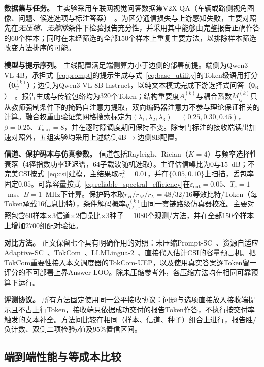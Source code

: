 \documentclass[journal]{IEEEtran}
\begin{document}
\textbf{数据集与任务。}
主实验采用车联网视觉问答数据集V2X-QA（车辆或路侧视角图像、问题、候选选项与标注答案）~\cite{you2026v2xqa}。为区分通信损失与上游感知失败，主要对照先在\emph{无压缩、无擦除}条件下检验报告充分性，并采用其中能够由完整报告正确作答的$60$个样本；同时在未经筛选的全部$150$个样本上重复主要方法，以排除样本筛选改变方法排序的可能。

\textbf{模型与提示序列。}
主线配置满足端侧算力小于边侧的部署前提。端侧为Qwen3-VL-4B，承担式~\eqref{eq:prompt}的提示生成与式~\eqref{eq:base_utility}的Token级语用打分（$\bm\theta_{\mathrm T}^{(k)}$）；边侧为Qwen3-VL-8B-Instruct，以纯文本模式完成下游选择式问答（$\bm\theta_{\mathrm R}$）~\cite{bai2025qwen3vl}。报告生成与传输包络均为$320$个Token；结构重要度$A_i^{(k)}$与耦合系数$M_{ij}^{(k)}$只从教师强制条件下的掩码自注意力提取，双向编码器注意力不参与理论保证相关的计算。融合权重由验证集网格搜索标定为$(\lambda_1,\lambda_2,\lambda_3)=(0.25,0.30,0.45)$，$\beta=0.25$、$T_{\max}=8$，并在逐时隙调度期间保持不变。除专门标注的接收端读出加速对照外，五组实验均采用上述端侧4B$\rightarrow$边侧8B配置。

\textbf{信道、保护码本与仿真参数。}
信道包括Rayleigh、Rician（$K=4$）与频率选择性衰落（4径指数功率延迟谱，64子载波随机选取）。主评估信噪比为$0$与$15$~dB；不完美CSI按式~\eqref{eq:csi}建模，主结果取$\sigma_e^2=0.01$，并在$\{0.05,0.10\}$上扫描，丢包率固定$0.05$。可靠容量按式~\eqref{eq:reliable_spectral_efficiency}在$\varepsilon_{\mathrm{out}}=0.05$、$T_s=1$~ms、$B=1$~MHz下计算。保护码本取$r_H/r_M/r_L=48/32/16$等效比特/Token（每Token承载16信息比特），条件解码概率$q_{i\ell,\tau}^{(k)}$由同一套链路级仿真器校准。主要对照包含$60$样本$\times3$信道$\times2$信噪比$\times3$种子$=1080$个观测/方法，并在全部$150$个样本上增加$2700$组配对验证。

\textbf{对比方法。}
正文保留七个具有明确作用的对照：未压缩Prompt-SC~\cite{ren2025generative}、资源自适应Adaptive-SC~\cite{daiTowardAdaptive}、TokCom~\cite{qiao2025tokcom}、LLMLingua-2~\cite{pan2024llmlingua2}、直接代入估计CSI的容量预言机、把TokCom重要性接入本文调度器的TokCom-UEP，以及使用真实答案逐Token留一评分的不可部署上界Answer-LOO。除未压缩参考外，各压缩方法均在相同可靠预算下运行。

\textbf{评测协议。}
所有方法固定使用同一公平接收协议：问题与选项直接放入接收端提示且不占上行Token，接收端只依据成功交付的报告Token作答，不执行按交付率触发的文本补全。方法间比较在相同（样本、信道、种子）组合上进行，报告胜/负计数、双侧二项检验$p$值及$95\%$置信区间。

\subsection{端到端性能与等成本比较}
\label{sec:exp-b}
\end{document}
